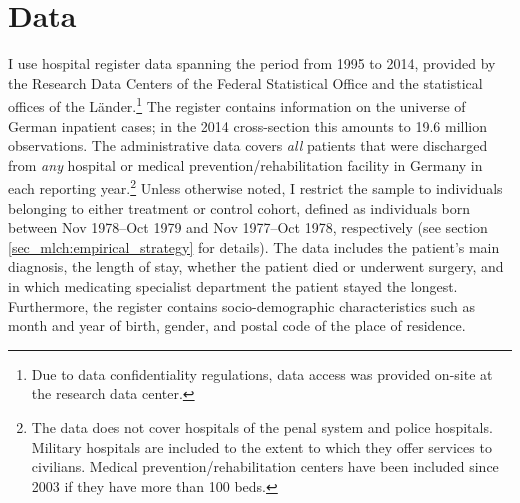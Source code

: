 \bigskip
\section{Data}\label{sec_mlch:data} 
I use hospital register data spanning the period from 1995 to 2014, provided by the Research Data Centers of the Federal Statistical Office and the statistical offices of the Länder.\footnote{Due to data confidentiality regulations, data access was provided on-site at the research data center.} The register contains information on the universe of German inpatient cases; in the 2014 cross-section this amounts to 19.6 million observations. The administrative data covers \textit{all} patients that were discharged from \textit{any} hospital or medical prevention/rehabilitation facility in Germany in each reporting year.\footnote{The data does not cover hospitals of the penal system and police hospitals. Military hospitals are included to the extent to which they offer services to civilians. Medical prevention/rehabilitation centers have been included since 2003 if they have more than 100 beds.} Unless otherwise noted, I restrict the sample to individuals belonging to either treatment or control cohort, defined as individuals born between Nov 1978--Oct 1979 and Nov 1977--Oct 1978, respectively (see section \ref{sec_mlch:empirical_strategy} for details). The data includes the patient's main diagnosis, the length of stay, whether the patient died or underwent surgery, and in which medicating specialist department the patient stayed the longest. Furthermore, the register contains socio-demographic characteristics such as month and year of birth, gender, and postal code of the place of residence.


